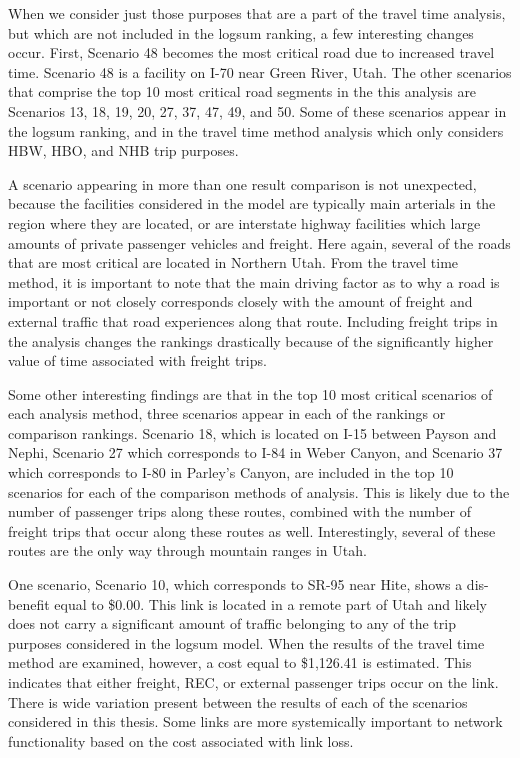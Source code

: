 When we consider just those purposes that are a part of the travel time analysis,
but which are not included in the logsum ranking, a few interesting changes occur.
First, Scenario 48 becomes the most critical road due to increased travel time.
Scenario 48 is a facility on I-70 near Green River, Utah.
The other scenarios that comprise the top 10 most critical road segments
in the this analysis are Scenarios 13, 18, 19, 20, 27, 37, 47, 49, and 50. Some
of these scenarios appear in the logsum ranking, and in the travel time method
analysis which only considers HBW, HBO, and NHB trip purposes.

A scenario appearing in more than one result comparison is not unexpected,
because the facilities considered in the model are typically main
arterials in the region where they are located, or are interstate highway
facilities which large amounts of private passenger vehicles and freight.
Here again, several of the roads that are most critical are located in
Northern Utah. From the travel time method, it is important to note that the main driving factor as to
why a road is important or not closely corresponds closely with
the amount of
freight and external traffic that road experiences along that route. Including freight
trips in the analysis changes the rankings
drastically because of the significantly higher value of time associated
with freight trips.

Some other interesting findings are that in the top 10 most critical scenarios of each analysis
method, three scenarios appear in each of the rankings or comparison rankings. Scenario 18, which is located on
I-15 between Payson and Nephi, Scenario 27 which corresponds to I-84 in Weber
Canyon, and Scenario 37 which corresponds to I-80 in Parley’s Canyon,
are included in the
top 10 scenarios for each of the comparison methods of analysis. This is likely due to the
number of passenger trips along these routes, combined with the number of freight
trips that occur along these routes as well. Interestingly, several of these routes are
the only way through mountain ranges in Utah.

One scenario, Scenario 10, which corresponds to SR-95 near Hite, shows a
dis-benefit equal to \$0.00. This link is located in a remote part of Utah and likely
does not carry a significant amount of traffic belonging to any of the trip purposes
considered in the logsum model. When the results of the travel time method are examined,
however, a cost equal to \$1,126.41 is estimated. This indicates that either freight,
REC, or external passenger trips occur on the link. There is wide variation present between
the results of each of the scenarios considered in this thesis. Some links are more
systemically important to network functionality based on the cost associated with
link loss.

